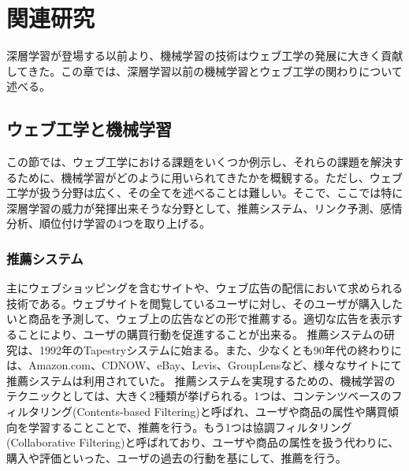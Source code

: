 \chapter{関連研究}
深層学習が登場する以前より、機械学習の技術はウェブ工学の発展に大きく貢献してきた。この章では、深層学習以前の機械学習とウェブ工学の関わりについて述べる。

\section{ウェブ工学と機械学習}
この節では、ウェブ工学における課題をいくつか例示し、それらの課題を解決するために、機械学習がどのように用いられてきたかを概観する。ただし、ウェブ工学が扱う分野は広く、その全てを述べることは難しい。そこで、ここでは特に深層学習の威力が発揮出来そうな分野として、推薦システム、リンク予測、感情分析、順位付け学習の4つを取り上げる。

\subsection{推薦システム}
主にウェブショッピングを含むサイトや、ウェブ広告の配信において求められる技術である。ウェブサイトを閲覧しているユーザに対し、そのユーザが購入したいと商品を予測して、ウェブ上の広告などの形で推薦する。適切な広告を表示することにより、ユーザの購買行動を促進することが出来る。
推薦システムの研究は、1992年のTapestryシステムに始まる\cite{goldberg1992using}。また、少なくとも90年代の終わりには、Amazon.com、CDNOW、eBay、Levis、GroupLensなど、様々なサイトにて推薦システムは利用されていた\cite{resnick1997recommender}。
推薦システムを実現するための、機械学習のテクニックとしては、大きく2種類が挙げられる\cite{koren2009matrix}。1つは、コンテンツベースのフィルタリング(Contents-based Filtering)と呼ばれ、ユーザや商品の属性や購買傾向を学習することことで、推薦を行う。もう1つは協調フィルタリング(Collaborative Filtering)と呼ばれており、ユーザや商品の属性を扱う代わりに、購入や評価といった、ユーザの過去の行動を基にして、推薦を行う。

